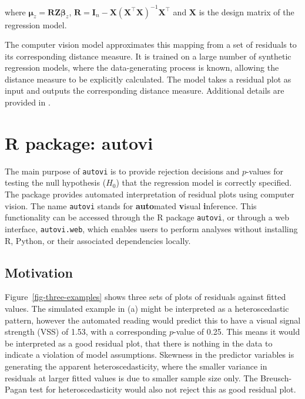 \documentclass[
doublespace,
  times]{anzsauth}
\begin{document}
where
\(\boldsymbol{\mu}_z = \boldsymbol{R}\boldsymbol{Z}\boldsymbol{\beta}_z\),
\(\boldsymbol{R} = \boldsymbol{I}_n - \boldsymbol{X}(\boldsymbol{X}^\top\boldsymbol{X})^{-1}\boldsymbol{X}^\top\)
and \(\boldsymbol{X}\) is the design matrix of the regression model.

The computer vision model approximates this mapping from a set of
residuals to its corresponding distance measure. It is trained on a
large number of synthetic regression models, where the data-generating
process is known, allowing the distance measure to be explicitly
calculated. The model takes a residual plot as input and outputs the
corresponding distance measure. Additional details are provided in
\citet{li2024automated}.

\section{R package: autovi}\label{sec-autovi}

The main purpose of \texttt{autovi} is to provide rejection decisions
and \(p\)-values for testing the null hypothesis (\(H_0\)) that the
regression model is correctly specified. The package provides automated
interpretation of residual plots using computer vision. The name
\texttt{autovi} stands for \textbf{auto}mated \textbf{v}isual
\textbf{i}nference. This functionality can be accessed through the R
package \texttt{autovi}, or through a web interface,
\texttt{autovi.web}, which enables users to perform analyses without
installing R, Python, or their associated dependencies locally.

\subsection{Motivation}\label{sec-why}

Figure~\ref{fig-three-examples} shows three sets of plots of residuals
against fitted values. The simulated example in (a) might be interpreted
as a heteroscedastic pattern, however the automated reading would
predict this to have a visual signal strength (VSS) of 1.53, with a
corresponding \(p\)-value of 0.25. This means it would be interpreted as
a good residual plot, that there is nothing in the data to indicate a
violation of model assumptions. Skewness in the predictor variables is
generating the apparent heteroscedasticity, where the smaller variance
in residuals at larger fitted values is due to smaller sample size only.
The Breusch-Pagan test \citep{breusch1979simple} for heteroscedasticity
would also not reject this as good residual plot.
\end{document}
